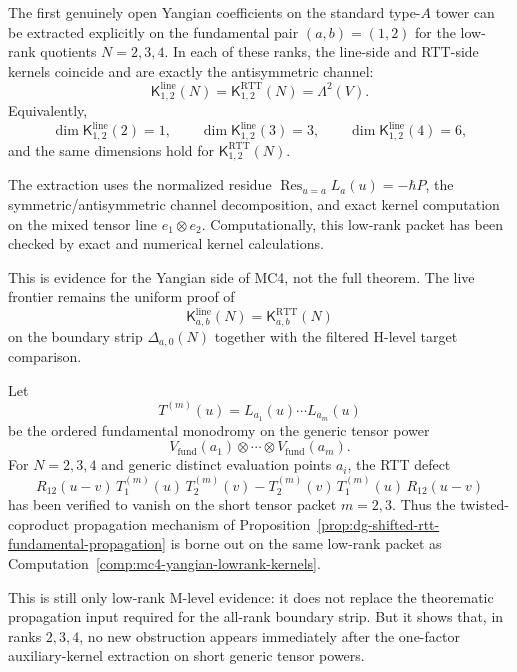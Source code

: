 \begin{computation}
\label{comp:mc4-yangian-lowrank-kernels}
The first genuinely open Yangian coefficients on the standard
type-$A$ tower can be extracted explicitly on the fundamental pair
$(a,b)=(1,2)$ for the low-rank quotients $N=2,3,4$.  In each of these
ranks, the line-side and RTT-side kernels coincide and are exactly the
antisymmetric channel:
\[
\mathsf{K}^{\mathrm{line}}_{1,2}(N)
=
\mathsf{K}^{\mathrm{RTT}}_{1,2}(N)
=
\Lambda^2(V).
\]
Equivalently,
\[
\dim \mathsf{K}^{\mathrm{line}}_{1,2}(2)=1,\qquad
\dim \mathsf{K}^{\mathrm{line}}_{1,2}(3)=3,\qquad
\dim \mathsf{K}^{\mathrm{line}}_{1,2}(4)=6,
\]
and the same dimensions hold for
$\mathsf{K}^{\mathrm{RTT}}_{1,2}(N)$.

The extraction uses the normalized residue
$\operatorname*{Res}_{u=a}L_a(u)=-\hbar P$, the symmetric/antisymmetric
channel decomposition, and exact kernel computation on the mixed
tensor line $e_1\otimes e_2$.  Computationally, this low-rank packet
has been checked by exact and numerical kernel calculations.

This is evidence for the Yangian side of MC4, not the full theorem.
The live frontier remains the uniform proof of
\[
\mathsf{K}^{\mathrm{line}}_{a,b}(N)
=
\mathsf{K}^{\mathrm{RTT}}_{a,b}(N)
\]
on the boundary strip $\Delta_{a,0}(N)$ together with the filtered
H-level target comparison.
\end{computation}

\begin{computation}
\label{comp:mc4-yangian-lowrank-propagation}
Let
\[
T^{(m)}(u)=L_{a_1}(u)\cdots L_{a_m}(u)
\]
be the ordered fundamental monodromy on the generic tensor power
\[
V_{\mathrm{fund}}(a_1)\otimes\cdots\otimes V_{\mathrm{fund}}(a_m).
\]
For $N=2,3,4$ and generic distinct evaluation points $a_i$, the RTT
defect
\[
R_{12}(u-v)\,T^{(m)}_1(u)\,T^{(m)}_2(v)
-
T^{(m)}_2(v)\,T^{(m)}_1(u)\,R_{12}(u-v)
\]
has been verified to vanish on the short tensor packet $m=2,3$.
Thus the twisted-coproduct propagation mechanism of
Proposition~\ref{prop:dg-shifted-rtt-fundamental-propagation} is borne
out on the same low-rank packet as
Computation~\ref{comp:mc4-yangian-lowrank-kernels}.

This is still only low-rank M-level evidence: it does not replace the
theorematic propagation input required for the all-rank boundary strip.
But it shows that, in ranks $2,3,4$, no new obstruction appears
immediately after the one-factor auxiliary-kernel extraction on short
generic tensor powers.
\end{computation}

